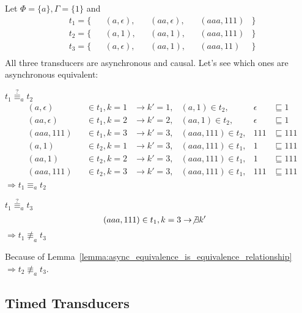 \begin{exmp}[name = Asynchronous equivalence of Transducers]
  Let \(\Phi = \{a\}, \Gamma = \{1\}\) and \\
  \begin{align*}
    &t_1 = \{&&(a,\epsilon),  &&(aa,\epsilon),  &&(aaa,111)   &\} \\
    &t_2 = \{&&(a,1),         &&(aa,1),         &&(aaa,111)   &\} \\
    &t_3 = \{&&(a,\epsilon),  &&(aa,1),         &&(aaa,11)    &\}\\
  \end{align*}
  All three transducers are asynchronous and causal.
  Let's see which ones are asynchronous equivalent:

  \(t_1 \stackrel{?}{\equiv}_a t_2\)
  \begin{align*}
    &(a,\epsilon)  &&\in t_1, k = 1 &\rightarrow k' = 1, &(a,1)     \in t_2, &\epsilon  &\sqsubseteq 1 \\
    &(aa,\epsilon) &&\in t_1, k = 2 &\rightarrow k' = 2, &(aa,1)    \in t_2, &\epsilon  &\sqsubseteq 1 \\
    &(aaa,111)     &&\in t_1, k = 3 &\rightarrow k' = 3, &(aaa,111) \in t_2, &111       &\sqsubseteq 111 \\
    &(a,1)         &&\in t_2, k = 1 &\rightarrow k' = 3, &(aaa,111) \in t_1, &1         &\sqsubseteq 111 \\
    &(aa,1)        &&\in t_2, k = 2 &\rightarrow k' = 3, &(aaa,111) \in t_1, &1         &\sqsubseteq 111 \\
    &(aaa,111)     &&\in t_2, k = 3 &\rightarrow k' = 3, &(aaa,111) \in t_1, &111       &\sqsubseteq 111 \\
  \end{align*}
  \(\Rightarrow t_1 \equiv_a t_2\)

  \(t_1 \stackrel{?}{\equiv}_a t_3\)
  \begin{align*}
    &(aaa,111)     \in t_1, k = 3 \rightarrow \not\exists k'
  \end{align*}
  \(\Rightarrow t_1 \not\equiv_a t_3\)

  Because of Lemma~\ref{lemma:async_equivalence_is_equivalence_relationship} \(\Rightarrow t_2 \not\equiv_a t_3\).

\end{exmp}

\subsection{Timed Transducers}\label{sec:concepts:def:timed_transducer}

